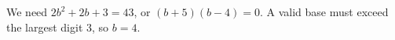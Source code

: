 We need $2b^2+2b+3=43$, or $(b+5)(b-4)=0$. A valid base must exceed the largest digit 3, so $\boxed{b=4}$.
